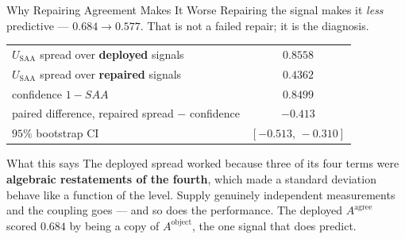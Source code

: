 \documentclass[aspectratio=169,11pt]{beamer}
\begin{document}
\begin{frame}{Why Repairing Agreement Makes It Worse}
\small
Repairing the signal makes it \emph{less} predictive --- $0.684 \rightarrow 0.577$. That is not a failed repair; it is the diagnosis.
\vspace{2mm}
\begin{center}
\footnotesize
\begin{tabular}{@{}l c@{}}
\toprule
$U_{\text{SAA}}$ spread over \textbf{deployed} signals & $0.8558$ \\
$U_{\text{SAA}}$ spread over \textbf{repaired} signals & $\mathbf{0.4362}$ \\
confidence $1-SAA$ & $0.8499$ \\
\midrule
paired difference, repaired spread $-$ confidence & $-0.413$ \\
$95\%$ bootstrap CI & $[-0.513,\,-0.310]$ \\
\bottomrule
\end{tabular}
\end{center}
\vspace{2mm}
\begin{alertblock}{\small What this says}
\footnotesize The deployed spread worked because three of its four terms were \textbf{algebraic restatements of the fourth}, which made a standard deviation behave like a function of the level. Supply genuinely independent measurements and the coupling goes --- and so does the performance. The deployed $A^{\text{agree}}$ scored $0.684$ by being a copy of $A^{\text{object}}$, the one signal that does predict.
\end{alertblock}
\end{frame}
\end{document}
